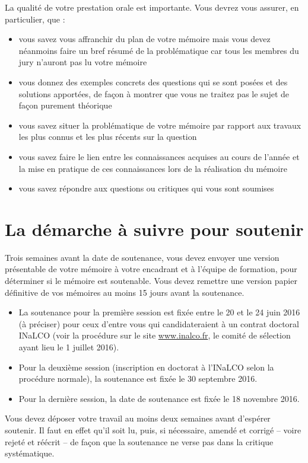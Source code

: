 \documentclass{report}
\begin{document}
La qualité de votre prestation orale est importante. Vous devrez vous assurer, en particulier, que :
\begin{itemize}
\item vous savez vous affranchir du plan de votre mémoire mais vous devez néanmoins faire un bref résumé de la problématique car tous les membres du jury n'auront pas lu votre mémoire
\item vous donnez des exemples concrets des questions qui se sont posées et des solutions apportées, de façon à montrer que vous ne traitez pas le sujet de façon purement théorique
\item vous savez situer la problématique de votre mémoire par rapport aux travaux les plus connus et les plus récents sur la question
\item vous savez faire le lien entre les connaissances acquises au cours de l'année et la mise en pratique de ces connaissances lors de la réalisation du mémoire
\item vous savez répondre aux questions ou critiques qui vous sont soumises
\end{itemize}

\section{La démarche à suivre pour soutenir}
Trois semaines avant la date de soutenance, vous devez envoyer une version présentable de votre mémoire à votre encadrant et à l'équipe de formation, pour déterminer si le mémoire est soutenable. Vous devez remettre une version papier définitive de vos mémoires au moins 15 jours avant la soutenance.
\begin{itemize}
\item La soutenance pour la première session est fixée entre le 20 et le 24 juin 2016 (à préciser) pour ceux d'entre vous qui candidateraient à un contrat doctoral INaLCO (voir la procédure sur le site \url{www.inalco.fr}, le comité de sélection ayant lieu le 1 juillet 2016).
\item Pour la deuxième session (inscription en doctorat à l'INaLCO selon la procédure normale), la soutenance est fixée le 30 septembre 2016.
\item Pour la dernière session, la date de soutenance est fixée le 18 novembre 2016.
\end{itemize}

Vous devez déposer votre travail au moins deux semaines avant d'espérer soutenir. Il faut en effet qu'il soit lu, puis, si nécessaire, amendé et corrigé -- voire rejeté et réécrit -- de façon que la soutenance ne verse pas dans la critique systématique.
\end{document}
